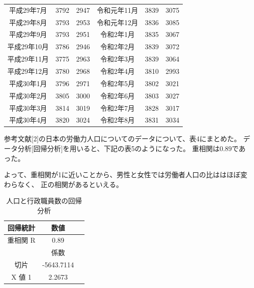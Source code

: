 \documentclass[12pt]{jarticle}
\begin{document}
\begin{table}[htb]
\begin{center}
\begin{tabular}{|c|c|c||c|c|c|}
            平成29年7月  & 3792     & 2947     & 令和元年11月 & 3839     & 3075     \\
            平成29年8月  & 3793     & 2953     & 令和元年12月 & 3836     & 3085     \\
            平成29年9月  & 3793     & 2951     & 令和2年1月   & 3835     & 3067     \\
            平成29年10月 & 3786     & 2946     & 令和2年2月   & 3839     & 3072     \\
            平成29年11月 & 3775     & 2963     & 令和2年3月   & 3839     & 3064     \\
            平成29年12月 & 3780     & 2968     & 令和2年4月   & 3810     & 2993     \\
            平成30年1月  & 3796     & 2971     & 令和2年5月   & 3802     & 3021     \\
            平成30年2月  & 3805     & 3000     & 令和2年6月   & 3803     & 3027     \\
            平成30年3月  & 3814     & 3019     & 令和2年7月   & 3828     & 3017     \\
            平成30年4月  & 3820     & 3024     & 令和2年8月   & 3831     & 3034     \\ \hline
        \end{tabular}
    \end{center}
\end{table}
参考文献[2]の日本の労働力人口についてのデータについて、表4にまとめた。
データ分析[回帰分析]を用いると、下記の表5のようになった。
重相関は$0.89$であった。

よって、重相関が1に近いことから、男性と女性では労働者人口の比ははほぼ変わらなく、
正の相関があるといえる。
\clearpage
\begin{table}[htb]
    \begin{center}
        \caption{人口と行政職員数の回帰分析}
        \begin{tabular}{|c|c|c|} \hline
            回帰統計 & 数値       \\ \hline
            重相関 R & 0.89       \\
            \hline  \hline
                     & 係数       \\\hline
            切片     & -5643.7114 \\ \hline
            X 値 1   & 2.2673     \\ \hline
        \end{tabular}
    \end{center}
\end{table}
\end{document}
